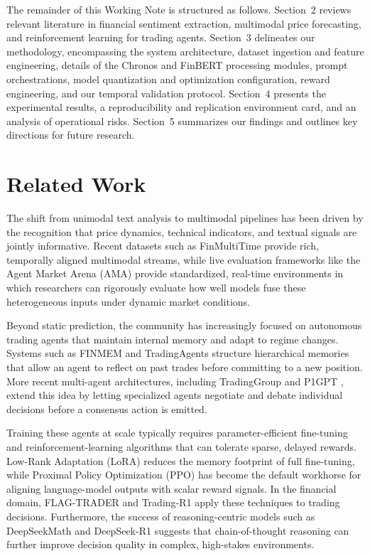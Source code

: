     The remainder of this Working Note is structured as follows. Section~2 reviews relevant literature in financial sentiment extraction, multimodal price forecasting, and reinforcement learning for trading agents. Section~3 delineates our methodology, encompassing the system architecture, dataset ingestion and feature engineering, details of the Chronos and FinBERT processing modules, prompt orchestrations, model quantization and optimization configuration, reward engineering, and our temporal validation protocol. Section~4 presents the experimental results, a reproducibility and replication environment card, and an analysis of operational risks. Section~5 summarizes our findings and outlines key directions for future research.

    \section{Related Work}

    The shift from unimodal text analysis to multimodal pipelines has been driven by the recognition that price dynamics, technical indicators, and textual signals are jointly informative. Recent datasets such as FinMultiTime \cite{xu2025finmultitime} provide rich, temporally aligned multimodal streams, while live evaluation frameworks like the Agent Market Arena (AMA) \cite{qian2025whenagentstrade} provide standardized, real-time environments in which researchers can rigorously evaluate how well models fuse these heterogeneous inputs under dynamic market conditions.

    Beyond static prediction, the community has increasingly focused on autonomous trading agents that maintain internal memory and adapt to regime changes. Systems such as FINMEM \cite{yu2024finmem} and TradingAgents \cite{xiao2024tradingagents} structure hierarchical memories that allow an agent to reflect on past trades before committing to a new position. More recent multi-agent architectures, including TradingGroup \cite{tian2025tradinggroup} and P1GPT \cite{lu2025p1gpt}, extend this idea by letting specialized agents negotiate and debate individual decisions before a consensus action is emitted.

    Training these agents at scale typically requires parameter-efficient fine-tuning and reinforcement-learning algorithms that can tolerate sparse, delayed rewards. Low-Rank Adaptation (LoRA) \cite{hu2022lora} reduces the memory footprint of full fine-tuning, while Proximal Policy Optimization (PPO) \cite{schulman2017ppo} has become the default workhorse for aligning language-model outputs with scalar reward signals. In the financial domain, FLAG-TRADER \cite{xiong2025flagtrader} and Trading-R1 \cite{xiao2025tradingr1} apply these techniques to trading decisions. Furthermore, the success of reasoning-centric models such as DeepSeekMath \cite{shao2024deepseekmath} and DeepSeek-R1 \cite{deepseek2025deepseekr1} suggests that chain-of-thought reasoning can further improve decision quality in complex, high-stakes environments.

